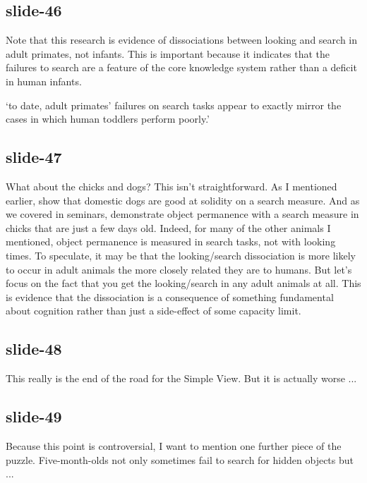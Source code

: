 \documentclass[12pt,\papersize]{extarticle}
\begin{document}
\subsection{slide-46}
Note that this research is evidence of dissociations between looking and
search in adult primates, not infants.
This is important because it indicates that the failures to search are a
feature of the core knowledge system rather than a deficit in human
infants.

‘to date, adult primates’ failures on search tasks appear to
      exactly mirror the cases in which human toddlers perform poorly.’
\citep[p.\ 17]{santos:2009_object}

\subsection{slide-47}
What about the chicks and dogs?
This isn't straightforward.
As I mentioned earlier, \citep{kundey:2010_domesticated} show that domestic dogs are good
at solidity on a search measure.  And as we covered in seminars,
\citep{chiandetti:2011_chicks_op} demonstrate object permanence with a search measure in
chicks that are just a few days old.
Indeed, for many of the other animals I mentioned, object permanence is measured in search
tasks, not with looking times.
To speculate, it may be that the looking/search dissociation is more likely to occur in
adult animals the more closely related they are to humans.
But let's focus on the fact that you get the looking/search in any adult animals at all.
This is evidence that the dissociation is a consequence of something fundamental about
cognition rather than just a side-effect of some capacity limit.

\subsection{slide-48}
This really is the end of the road for the Simple View.
But it is actually worse ...

\subsection{slide-49}
Because this point is controversial, I want to mention one further
piece of the puzzle.
Five-month-olds not only sometimes fail to search for hidden objects but
...
\end{document}
